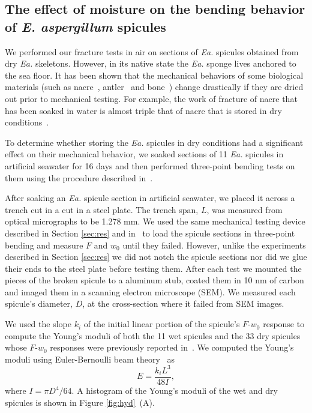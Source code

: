 \documentclass[12pt,onecolumn]{article}
\makeatletter
\newcommand{\EA}{\textit{Ea.\@}\xspace}
\makeatother
\begin{document}
\begin{bibunit}
\section{The effect of moisture on the bending behavior of \textit{E. aspergillum} spicules}
\label{sec:hyd}

We performed our fracture tests in air on sections of \EA spicules obtained from dry \EA skeletons. However, in its native state the \EA sponge lives anchored to the sea floor. It has been shown that the mechanical behaviors of some biological materials (such as nacre~\cite{barthelat2007mechanics}, antler~\cite{chen2008fracture} and bone~\cite{chen2008fracture}) change drastically if they are dried out prior to mechanical testing. For example, the work of fracture of nacre that has been soaked in water is almost triple that of nacre that is stored in dry conditions~\cite{jackson1988}.

To determine whether storing the \EA spicules in dry conditions had a significant effect on their mechanical behavior,  we soaked sections of 11 \EA spicules in artificial seawater for 16 days and then performed three-point bending tests on them using the procedure described in~\cite{monn2017enhanced}. 

After soaking an \EA spicule section in artificial seawater, we placed it across a trench cut in a cut in a steel plate. The trench span, $L$, was measured from optical micrographs to be 1.278 mm. We used the same mechanical testing device described in Section \ref{sec:res} and in~\cite{monn2017enhanced} to load the spicule sections in three-point bending and measure $F$ and $w_0$ until they failed. However, unlike the experiments described in Section \ref{sec:res} we did not notch the spicule sections nor did we glue their ends to the steel plate before testing them. After each test we mounted the pieces of the broken spicule to a aluminum stub, coated them in 10 nm of carbon and imaged them in a scanning electron microscope (SEM). We measured each spicule's diameter, $D$, at the cross-section where it failed from SEM images.

We used the slope $k_i$ of the initial linear portion of the spicule's $F$-$w_0$ response to compute the Young's moduli of both the 11 wet spicules and the 33 dry spicules whose $F$-$w_0$ responses were previously reported in~\cite{monn2017enhanced}. We computed the Young's moduli using Euler-Bernoulli beam theory~\cite{gere1997mechanics} as
%
\begin{equation}
\label{eq0}
E=\frac{k_i L^3}{48 I},
\end{equation}
%
where $I=\pi D^4/64$. A histogram of the Young's moduli of the wet and dry spicules is shown in Figure \ref{fig:hyd}~(A). 


\end{bibunit}
\end{document}
